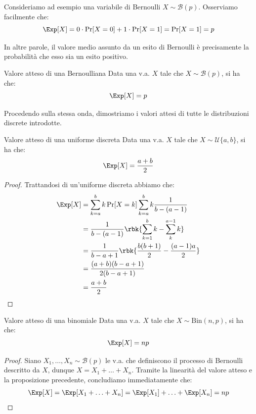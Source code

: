 \documentclass[a4paper, 12pt]{report}
\begin{document}
    Consideriamo ad esempio una variabile di Bernoulli $X \sim \mathcal{B}(p)$. Osserviamo facilmente che:
    \[\Exp[X] = 0 \cdot \Pr[X = 0] + 1 \cdot \Pr[X = 1] = \Pr[X = 1] = p\]

    In altre parole, il valore medio assunto da un esito di Bernoulli è precisamente la probabilità che esso sia un esito positivo.

    \begin{framedprop}{Valore atteso di una Bernoulliana}
        Data una v.a. $X$ tale che $X \sim \mathcal{B}(p)$, si ha che:
        \[\Exp[X] = p\]
    \end{framedprop}

    Procedendo sulla stessa onda, dimostriamo i valori attesi di tutte le distribuzioni discrete introdotte.

    \begin{framedprop}{Valore atteso di una uniforme discreta}
        Data una v.a. $X$ tale che $X \sim \mathcal{U}\{a,b\}$, si ha che:
        \[\Exp[X] = \frac{a+b}{2}\]
    \end{framedprop}

    \begin{proof}
        Trattandosi di un'uniforme discreta abbiamo che:
        \[\begin{split}
            \Exp[X] &= \sum_{k =a}^b k \Pr[X = k]\sum_{k = a}^b k \frac{1}{b-(a-1)} \\
            &= \frac{1}{b-(a-1)} \rbk{\sum_{k = 1}^{b} k - \sum_{k}^{a-1} k} \\
            &= \frac{1}{b-a+1} \rbk{\frac{b(b+1)}{2} - \frac{(a-1)a}{2}}\\
            &= \frac{(a+b)(b-a+1)}{2(b-a+1)} \\
            &= \frac{a+b}{2}
        \end{split}\]
    \end{proof}
    
    \begin{framedprop}{Valore atteso di una binomiale}
        Data una v.a. $X$ tale che $X \sim \mathrm{Bin}(n,p)$, si ha che:
        \[\Exp[X] = np\]
    \end{framedprop}

    \begin{proof}
        Siano $X_1, \ldots, X_n \sim \mathcal{B}(p)$ le v.a. che definiscono il processo di Bernoulli descritto da $X$, dunque $X = X_1 + \ldots + X_n$. Tramite la linearità del valore atteso e la proposizione precedente, concludiamo immediatamente che:
        \[\Exp[X] = \Exp[X_1 + \ldots + X_n] = \Exp[X_1] + \ldots + \Exp[X_n] = np\]
    \end{proof}
\end{document}
